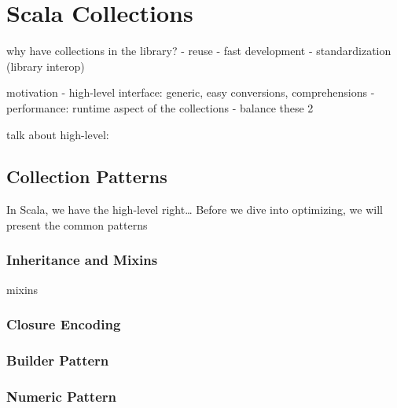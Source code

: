 \section{Scala Collections}

why have collections in the library?
 - reuse
 - fast development
 - standardization (library interop)

motivation
 - high-level interface: generic, easy conversions, comprehensions
 - performance: runtime aspect of the collections
 - balance these 2

talk about high-level:

\subsection{Collection Patterns}

In Scala, we have the high-level right\ldots
Before we dive into optimizing, we will present the common patterns

\subsubsection{Inheritance and Mixins}

mixins \cite{scalable-component-abstractions}

\subsubsection{Closure Encoding}
\subsubsection{Builder Pattern}
\subsubsection{Numeric Pattern}